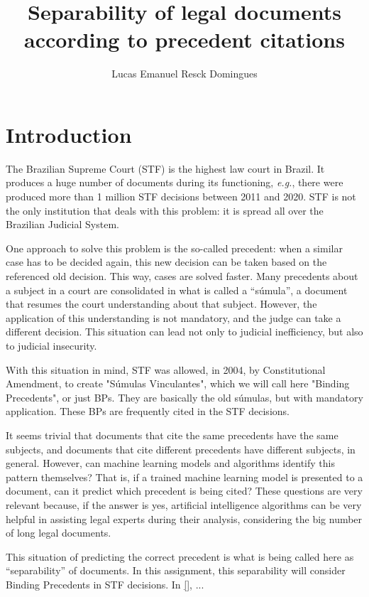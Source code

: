 \documentclass[twocolumn]{article}
\title{Separability of legal documents according to precedent citations}
\author{Lucas Emanuel Resck Domingues}
\begin{document}

      \section{Introduction}

            The Brazilian Supreme Court (STF) is the highest law court in Brazil. It produces a huge number of documents during its functioning, \textit{e.g.}, there were produced more than 1 million STF decisions \cite{} between 2011 and 2020. STF is not the only institution that deals with this problem: it is spread all over the Brazilian Judicial System.

            One approach to solve this problem is the so-called precedent: when a similar case has to be decided again, this new decision can be taken based on the referenced old decision. This way, cases are solved faster. Many precedents about a subject in a court are consolidated in what is called a ``súmula'', a document that resumes the court understanding about that subject. However, the application of this understanding is not mandatory, and the judge can take a different decision. This situation can lead not only to judicial inefficiency, but also to judicial insecurity.
            
            With this situation in mind, STF was allowed, in 2004, by Constitutional Amendment, to create "Súmulas Vinculantes", which we will call here "Binding Precedents", or just BPs. They are basically the old súmulas, but with mandatory application. These BPs are frequently cited in the STF decisions.
            
            It seems trivial that documents that cite the same precedents have the same subjects, and documents that cite different precedents have different subjects, in general. However, can machine learning models and algorithms identify this pattern themselves? That is, if a trained machine learning model is presented to a document, can it predict which precedent is being cited? These questions are very relevant because, if the answer is yes, artificial intelligence algorithms can be very helpful in assisting legal experts during their analysis, considering the big number of long legal documents.
            
            This situation of predicting the correct precedent is what is being called here as ``separability'' of documents. In this assignment, this separability will consider Binding Precedents in STF decisions. In \autoref{}, ...

      \nocite{*}
      
      
\end{document}

